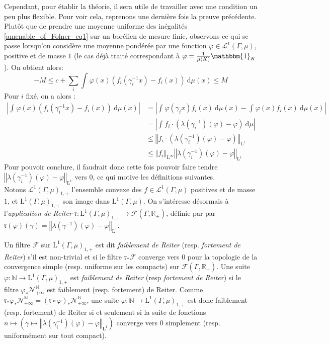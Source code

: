 \documentclass[a4paper,12pt]{article}
\newcommand{\R}{\mathbb{R}}
\newcommand{\N}{\mathbb{N}}
\newcommand{\norm}[1]{\left\Vert #1\right\Vert}
\newcommand{\abs}[1]{\left\vert#1\right\vert}
\newcommand{\indic}{\mathbbm{1}}
\newcommand{\integral}[4]{\int_{#1}^{#2} #3~\mathrm{d}#4}
\newcommand{\ssi}{si et seulement si }
\newcommand{\inv}{^{-1}}
\newcommand{\comp}{\circ}
\newcommand{\nhds}{\mathcal{N}}
\begin{document}
Cependant, pour établir la théorie, il sera utile de travailler avec une condition un peu plus flexible. Pour voir cela, reprenons une dernière fois la preuve
précédente. Plutôt que de prendre une moyenne uniforme des inégalités \ref{amenable_of_Folner_eq1} sur un borélien de mesure finie, observons ce qui se passe 
lorsqu'on considère une moyenne pondérée par une fonction $\varphi\in\mathscr{L}^1(\Gamma, \mu)$, positive et de masse $1$ (le cas déjà traité correspondant à $\varphi=\frac1{\mu(K)}\indic_K$).
On obtient alors:
\begin{equation*}\label{intuition_Reiter_eq1}
    -M \le c + \sum_i \integral{}{}{\varphi(x)\left(f_i(\gamma_i\inv x) - f_i(x)\right)}{\mu(x)} \le M
\end{equation*}
Pour $i$ fixé, on a alors :
\begin{align*}
    \abs{\integral{}{}{\varphi(x)(f_i(\gamma_i\inv x) - f_i(x))}{\mu(x)}} 
        &= \abs{\integral{}{}{\varphi(\gamma_i x)f_i(x)}{\mu(x)} - \integral{}{}{\varphi(x) f_i(x)}{\mu(x)}} \\
        &= \abs{\integral{}{}{f_i\cdot\left(\lambda(\gamma_i\inv)(\varphi)-\varphi\right)}{\mu}} \\
        &\le \norm{f_i\cdot\left(\lambda(\gamma_i\inv)(\varphi)-\varphi\right)}_{\mathrm{L}^1} \\
        &\le \norm{f_i}_{\mathrm{L}^\infty} \norm{\lambda(\gamma_i\inv)(\varphi)-\varphi}_{\mathrm{L}^1}
\end{align*}
Pour pouvoir conclure, il faudrait donc cette fois pouvoir faire tendre $\norm{\lambda(\gamma_i\inv)(\varphi)-\varphi}_{\mathrm{L}^1}$ vers $0$, ce qui motive les définitions suivantes.\\

Notons $\mathscr{L}^1(\Gamma, \mu)_{1,+}$ l'ensemble convexe des $f\in\mathscr{L}^1(\Gamma, \mu)$ positives et de masse $1$, et $\mathrm{L}^1(\Gamma, \mu)_{1, +}$ son image dans 
$\mathrm{L}^1(\Gamma, \mu)$. On s'intéresse désormais à l'\emph{application de Reiter} $\mathfrak{r} : \mathrm{L}^1(\Gamma, \mu)_{1, +}\to\mathcal{F}(\Gamma, \R_+)$, définie par
par $\mathfrak{r}(\varphi)(\gamma) = \norm{\lambda(\gamma\inv)(\varphi)-\varphi}_{\mathrm{L}^1}$.

Un filtre $\mathscr{F}$ sur $\mathrm{L}^1(\Gamma, \mu)_{1, +}$ est dit \emph{faiblement de Reiter} (resp. \emph{fortement de Reiter}) s'il est non-trivial et si le filtre $\mathfrak{r}_*\mathscr{F}$ converge vers $0$ pour la 
topologie de la convergence simple (resp. uniforme sur les compacts) sur $\mathcal{F}(\Gamma, \R_+)$. 
Une suite $\varphi:\N\to\mathrm{L}^1(\Gamma, \mu)_{1, +}$ est \emph{faiblement de Reiter} (resp \emph{fortement de Reiter}) si le filtre $\varphi_*\nhds_{+\infty}^\N$ est faiblement (resp. fortement) de Reiter. Comme $\mathfrak{r}_*\varphi_*\nhds_{+\infty}^\N = (\mathfrak{r}\comp \varphi)_*\nhds_{+\infty}^\N$,
une suite $\varphi:\N\to\mathrm{L}^1(\Gamma, \mu)_{1, +}$ est donc faiblement (resp. fortement) de Reiter \ssi la suite de fonctions
$n\mapsto\left(\gamma\mapsto\norm{\lambda(\gamma_i\inv)(\varphi)-\varphi}_{\mathrm{L}^1}\right)$ converge vers $0$ simplement 
(resp. uniformément sur tout compact).
\end{document}
